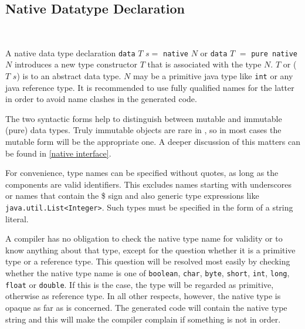\subsection{Native Datatype Declaration}    \label{nativedat}

\begin{flushleft}
    \sym{=}  
	\alt {}  \sym{=}   \\
  \oder{} 
 
  \alt {}
  \alt {}  
  \alt {}  
\end{flushleft}

A native data type declaration \texttt{data} $T$ $s =$ \texttt{native} $N$ or \texttt{data} $T$ $=$ \texttt{pure native} $N$ introduces a new type constructor $T$ that is associated with the \java{} type $N$. $T$ or ($T$ $s$) is to \frege{} an abstract data type. $N$ may be a primitive java type like \texttt{int} or any java reference type. It is recommended to use fully qualified \java{} names for the latter in order to avoid name clashes in the generated code.

The two syntactic forms help to distinguish between mutable and immutable (pure) data types. Truly immutable objects are rare in \java{}, so in most cases the mutable form will be the appropriate one. A deeper discussion of this matters can be found in \autoref{native interface}.

For convenience, \java{} type names can be specified without quotes, as long as the components are valid \frege{} identifiers. This excludes names starting with underscores or names that contain the \$ sign and also \java{} generic type expressions like \texttt{java.util.List<Integer>}. Such \java{} types must be specified in the form of a string literal.

A \frege{} compiler has no obligation to check the native type name for validity or to know anything about that type, except for the question whether it is a primitive type or a reference type.
This question will be resolved most easily by checking whether the native type name is one of \texttt{boolean}, \texttt{char}, \texttt{byte}, \texttt{short}, \texttt{int}, \texttt{long}, \texttt{float} or \texttt{double}.
If this is the case, the type will be regarded as primitive, otherwise as reference type.
In all other respects, however, the native type is opaque as far as \frege{} is concerned.
The generated code will contain the native type string and this will make the \java{} compiler complain if something is not in order.

